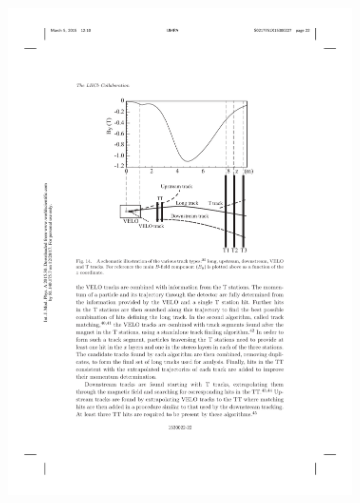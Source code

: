 \begin{figure}[!h]
    \centering
    \begin{subfigure}[m]{0.4\textwidth}
        \centering
        \includegraphics[width=1.0\textwidth]{figs/Detector/reco_track_types.pdf}
    \end{subfigure}
    \begin{subfigure}[m]{0.4\textwidth}
        \centering

\end{subfigure}
\end{figure}
